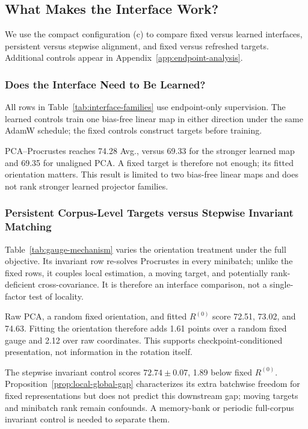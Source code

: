 \subsection{What Makes the Interface Work?}
\label{sec:analysis}

We use the compact configuration (c) to compare fixed versus learned
interfaces, persistent versus stepwise alignment, and fixed versus refreshed
targets. Additional controls appear in Appendix~\ref{app:endpoint-analysis}.

\subsubsection{Does the Interface Need to Be Learned?}
\label{sec:analysis-interface}

All rows in Table~\ref{tab:interface-families} use endpoint-only supervision.
The learned controls train one bias-free linear map in either direction under
the same AdamW schedule; the fixed controls construct targets before training.



PCA--Procrustes reaches 74.28 Avg., versus 69.33 for the stronger learned map
and 69.35 for unaligned PCA. A fixed target is therefore not enough; its fitted
orientation matters. This result is limited to two bias-free linear maps and
does not rank stronger learned projector families.

\subsubsection{Persistent Corpus-Level Targets versus Stepwise Invariant Matching}
\label{sec:analysis-gauge}

Table~\ref{tab:gauge-mechanism} varies the orientation treatment under the full
objective. Its invariant row re-solves Procrustes in every minibatch; unlike the
fixed rows, it couples local estimation, a moving target, and potentially
rank-deficient cross-covariance. It is therefore an interface comparison, not a
single-factor test of locality.



Raw PCA, a random fixed orientation, and fitted $R^{(0)}$ score 72.51, 73.02,
and 74.63. Fitting the orientation therefore adds 1.61 points over a random
fixed gauge and 2.12 over raw coordinates. This supports checkpoint-conditioned
presentation, not information in the rotation itself.

The stepwise invariant control scores $72.74\pm0.07$, 1.89 below fixed
$R^{(0)}$. Proposition~\ref{prop:local-global-gap} characterizes its extra
batchwise freedom for fixed representations but does not predict this downstream
gap; moving targets and minibatch rank remain confounds. A memory-bank or
periodic full-corpus invariant control is needed to separate them.

